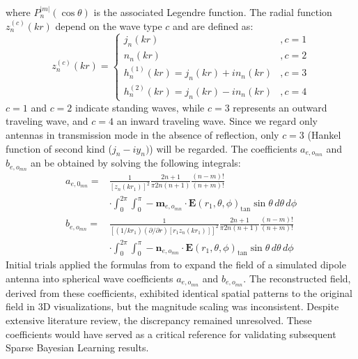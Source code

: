 \documentclass{article}
\begin{document}
where \(P_n^{|m|}(\cos \theta)\) is the associated Legendre function. The radial function \(z_n^{(c)}(kr)\) depend on the wave type \(c\) and are defined as:
\begin{equation}
    z_n^{(c)}(kr) = \begin{cases}
        j_n(kr) & , c = 1 \\
        n_n(kr) & , c = 2 \\
        h_n^{(1)}(kr) = j_n(kr) + i n_n(kr) & , c = 3 \\
        h_n^{(2)}(kr) = j_n(kr) - i n_n(kr) & , c = 4
    \end{cases}
\end{equation}
\(c = 1\) and \(c = 2\) indicate standing waves, while \(c = 3\) represents an outward traveling wave, and \(c = 4\) an inward traveling wave. Since we regard only antennas in transmission mode in the absence of reflection, only \(c=3\) (Hankel function of second kind (\(j_n-iy_n)\)) will be regarded. The coefficients \(a_{e,o_{mn}}\) and \(b_{e,o_{mn}}\) an be obtained by solving the following integrals:
\begin{equation}
    \begin{split}
        a_{e,0_{mn}} =& \frac{1}{\left[z_n(kr_1)\right]^2} \frac{2n+1}{\pi 2n (n+1)} \frac{(n-m)!}{(n+m)!} \\
        &\cdot \int_0^{2\pi} \int_0^{\pi} -\mathbf{m}_{e,o_{mn}} \cdot \mathbf{E}(r_1, \theta, \phi)_{\tan} \sin \theta \, d\theta \, d\phi\\
        b_{e,o_{mn}} = &\frac{1}{\left[(1/kr_1)(\partial/\partial r) [r_1 z_n(kr_1)]\right]^2} \frac{2n + 1}{\pi 2n (n+1)} \frac{(n - m)!}{(n + m)!}\\
        &\cdot \int_0^{2\pi} \int_0^{\pi} -\mathbf{n}_{e,o_{mn}} \cdot \mathbf{E}(r_1, \theta, \phi)_{\tan} \sin \theta \, d\theta \, d\phi
    \end{split}
    \label{eq:expansion}
\end{equation}
Initial trials applied the formulas from \citet{Ludwig1971NearfieldFT} to expand the field of a simulated dipole antenna into spherical wave coefficients \(a_{e,o_{mn}}\) and \(b_{e,o_{mn}}\). The reconstructed field, derived from these coefficients, exhibited identical spatial patterns to the original field in 3D visualizations, but the magnitude scaling was inconsistent. Despite extensive literature review, the discrepancy remained unresolved. These coefficients would have served as a critical reference for validating subsequent Sparse Bayesian Learning results.
\end{document}
